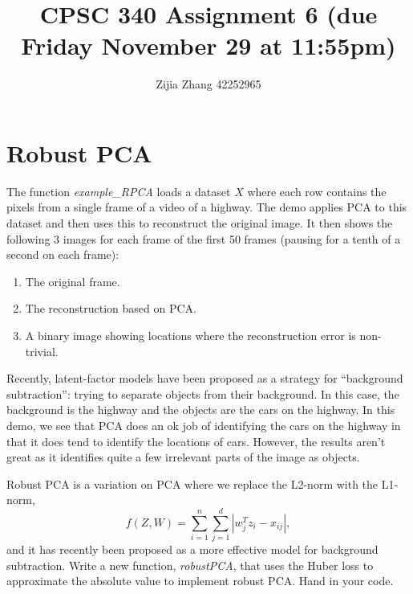 \documentclass{article}
\def\blu#1{{\color{blu}#1}}
\def\enum#1{\begin{enumerate}#1\end{enumerate}}
\begin{document}
\title{CPSC 340 Assignment 6 (due Friday November 29 at 11:55pm)}
\author{Zijia Zhang 42252965}
\date{}
\maketitle
\vspace{-2em}


\section{Robust PCA}


The function \emph{example\_RPCA} loads a dataset $X$ where each row contains the pixels from a single frame of a video of a highway. The demo applies PCA to this dataset and then uses this to reconstruct the original image. It then shows the following 3 images for each frame of the first 50 frames (pausing for a tenth of a second on each frame):
\enum{
\item The original frame.
\item The reconstruction based on PCA.
\item A binary image showing locations where the reconstruction error is non-trivial.
}
Recently, latent-factor models have been proposed as a strategy for ``background subtraction'': trying to separate objects from their background. In this case, the background is the highway and the objects are the cars on the highway. In this demo, we see that PCA does an ok job of identifying the cars on the highway in that it does tend to identify the locations of cars. However, the results aren't great as it identifies quite a few irrelevant parts of the image as objects.

Robust PCA is a variation on PCA where we replace the L2-norm with the L1-norm,
\[
f(Z,W) = \sum_{i=1}^n\sum_{j=1}^d |w_j^Tz_i - x_{ij}|,
\]
and it has recently been proposed as a more effective model for background subtraction. \blu{Write a new function, \emph{robustPCA}, that uses the Huber loss to approximate the absolute value to implement robust PCA. Hand in your code.}
\end{document}
